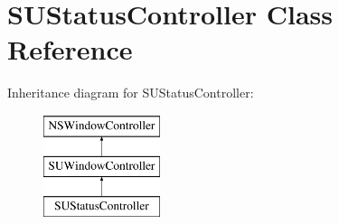 \hypertarget{interface_s_u_status_controller}{}\section{S\+U\+Status\+Controller Class Reference}
\label{interface_s_u_status_controller}
Inheritance diagram for S\+U\+Status\+Controller\+:\begin{figure}[H]
\begin{center}
\leavevmode
\includegraphics[height=3.000000cm]{interface_s_u_status_controller}
\end{center}
\end{figure}
